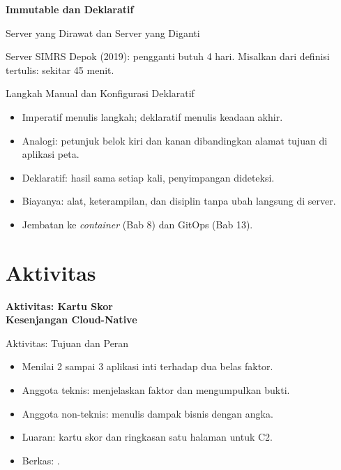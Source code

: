 \documentclass[aspectratio=169, table, 12pt]{beamer}
\begin{document}
\begin{frame}{\hfill}
  \centering
  \Huge{\textbf{Immutable dan Deklaratif}}
\end{frame}

\begin{frame}{{\Large Server yang Dirawat dan Server yang Diganti}}
  \centering

  \vspace{4pt}
  \footnotesize Server SIMRS Depok (2019): pengganti butuh 4 hari. Misalkan dari
  definisi tertulis: sekitar 45 menit.
\end{frame}

\begin{frame}{{\Large Langkah Manual dan Konfigurasi Deklaratif}}
  \vspace{10pt}
  \begin{itemize}
    \item Imperatif menulis langkah; deklaratif menulis keadaan akhir.
    \item Analogi: petunjuk belok kiri dan kanan dibandingkan alamat tujuan di
          aplikasi peta.
    \item Deklaratif: hasil sama setiap kali, penyimpangan dideteksi.
    \item Biayanya: alat, keterampilan, dan disiplin tanpa ubah langsung di
          server.
    \item Jembatan ke \textit{container} (Bab 8) dan GitOps (Bab 13).
  \end{itemize}
\end{frame}

\section{Aktivitas}

\begin{frame}{\hfill}
  \centering
  \Huge{\textbf{Aktivitas: Kartu Skor\\Kesenjangan Cloud-Native}}
\end{frame}

\begin{frame}{{\Large Aktivitas: Tujuan dan Peran}}
  \vspace{10pt}
  \begin{itemize}
    \item Menilai 2 sampai 3 aplikasi inti terhadap dua belas faktor.
    \item Anggota teknis: menjelaskan faktor dan mengumpulkan bukti.
    \item Anggota non-teknis: menulis dampak bisnis dengan angka.
    \item Luaran: kartu skor dan ringkasan satu halaman untuk C2.
    \item Berkas: .
  \end{itemize}
\end{frame}
\end{document}
